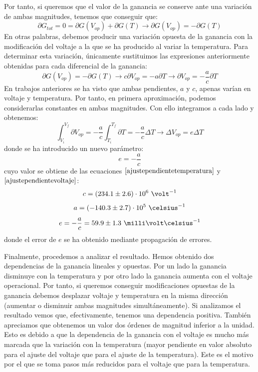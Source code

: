 Por tanto, si queremos que el valor de la ganancia se conserve ante una variación de ambas magnitudes, tenemos que conseguir que: 
\begin{equation}
\partial G_{tot} = 0 =  \partial G(V_{op}) + \partial G(T) \longrightarrow \partial G(V_{op}) = -\partial G(T)  
\label{basecompensacion}
\end{equation}
En otras palabras, debemos producir una  variación opuesta  de la ganancia con la modificación del voltaje a la que se ha producido al variar la temperatura. Para determinar esta variación, únicamente sustituimos las expresiones anteriormente obtenidas para cada diferencial de la ganancia:
\begin{equation}
\partial G(V_{op}) = - \partial G(T)  \longrightarrow c \partial V_{op}= - a \partial T \longrightarrow  \partial V_{op}= - \frac{a}{c} \partial T
\label{compensacionparciales}
\end{equation}
En trabajos anteriores\cite{TFMSiPM2, tesisSiPM, cladtesis} se ha visto que ambas pendientes, $a$ y $c$, apenas varían en voltaje y temperatura. Por tanto, en primera aproximación, podemos considerarlas constantes en ambas magnitudes. Con ello integramos a cada lado y obtenemos:
\begin{equation}
\int_{V_i}^{V_f} \partial V_{op}= - \frac{a}{c} \int_{T_i}^{T_f}\partial T = - \frac{a}{c} \Delta T \longrightarrow \Delta V_{op}= e \Delta T
\label{integral}
\end{equation}
donde se ha introducido un nuevo parámetro: $$e=-\frac{a}{c}$$ cuyo valor se obtiene de las ecuaciones $\eqref{ajustependientetemperatura}$  y $\eqref{ajustependientevoltaje}$:
\begin{equation}
c=(234.1 \pm 2.6) \cdot 10^6~\volt^{-1}
\label{pendientevoltaje}
\end{equation}
\begin{equation}
a=(-140.3 \pm 2.7) \cdot 10^5~ \celsius^{-1}
\label{pendientetemperatura}
\end{equation}
\begin{equation}
e=-\frac{a}{c} = 59.9 \pm 1.3 ~\milli\volt  \celsius^{-1}
\label{pendientecompensacion}
\end{equation}
donde el error de $e$ se ha obtenido mediante propagación de errores. 

Finalmente, procedemos a analizar el resultado. Hemos obtenido dos dependencias de la ganancia lineales y opuestas. Por un lado la ganancia disminuye con la temperatura y por otro lado la ganancia aumenta con el voltaje operacional. Por tanto, si queremos conseguir modificaciones opuestas de la ganancia debemos desplazar voltaje y temperatura en la misma dirección (aumentar o disminuir ambas magnitudes simultáneamente). Si analizamos el resultado vemos que, efectivamente, tenemos una dependencia positiva.
También apreciamos que obtenemos un valor dos órdenes de magnitud inferior a la unidad. Esto es debido a que la dependencia de la ganancia con el voltaje es mucho más marcada que la variación con la temperatura (mayor pendiente en valor absoluto para el ajuste del voltaje que para el ajuste de la temperatura). Este es el motivo por el que se toma pasos más reducidos para el voltaje que para la temperatura. 

